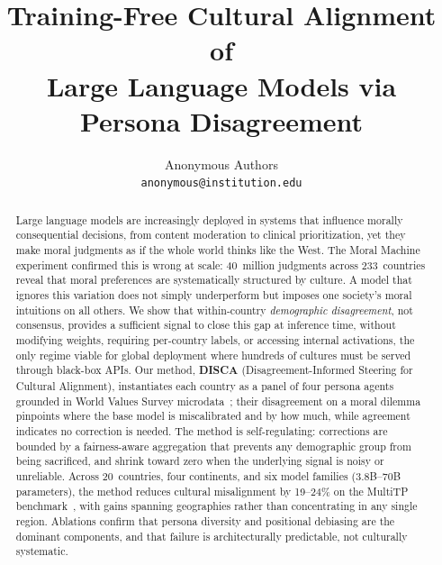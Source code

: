 \documentclass{article}
\title{%
  Training-Free Cultural Alignment of\\
  Large Language Models via Persona Disagreement%
}
\author{%
  Anonymous Authors\\
  \texttt{anonymous@institution.edu}
}
\begin{document}
\maketitle

\begin{abstract}

Large language models are increasingly deployed in systems that influence morally consequential decisions, from content moderation to clinical prioritization, yet they make moral judgments as if the whole world thinks like the West. The Moral Machine experiment \citep{awad2018moral} confirmed this is wrong at scale: 40~million judgments across 233~countries reveal that moral preferences are systematically structured by culture. A model that ignores this variation does not simply underperform but imposes one society's moral intuitions on all others. We show that within-country \emph{demographic disagreement}, not consensus, provides a sufficient signal to close this gap at inference time, without modifying weights, requiring per-country labels, or accessing internal activations, the only regime viable for global deployment where hundreds of cultures must be served through black-box APIs. Our method, \textbf{DISCA} (Disagreement-Informed Steering for Cultural Alignment), instantiates each country as a panel of four persona agents grounded in World Values Survey microdata~\citep{haerpfer2022wvs}; their disagreement on a moral dilemma pinpoints where the base model is miscalibrated and by how much, while agreement indicates no correction is needed. The method is self-regulating: corrections are bounded by a fairness-aware aggregation that prevents any demographic group from being sacrificed, and shrink toward zero when the underlying signal is noisy or unreliable. Across 20~countries, four continents, and six model families (3.8B--70B parameters), the method reduces cultural misalignment by 19--24\% on the MultiTP benchmark~\citep{jin2025multitp}, with gains spanning geographies rather than concentrating in any single region. Ablations confirm that persona diversity and positional debiasing are the dominant components, and that failure is architecturally predictable, not culturally systematic.




\end{abstract}
\end{document}
